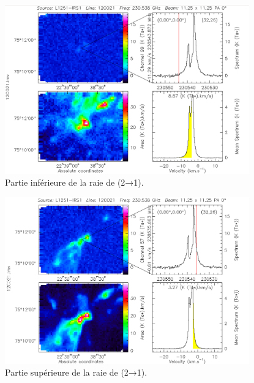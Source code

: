 \documentclass[a4paper,10pt,french]{article}
\begin{document}
\begin{figure}[!ht]
    \centering
    \includegraphics[width=0.94\textwidth]{12COblue.png}
    \caption{Partie inférieure de la raie de  (2→1).}
    \label{fig:12COblue}
\end{figure}

\begin{figure}[!ht]
    \centering
    \includegraphics[width=0.94\textwidth]{12COred.png}
    \caption{Partie supérieure de la raie de  (2→1).}
    \label{fig:12COred}
\end{figure}
\end{document}
